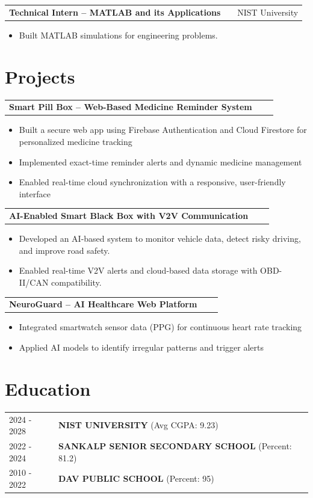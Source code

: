 \documentclass[a4paper,12pt]{article}
\makeatletter
\newenvironment{joblong}[2]
    {
    \begin{tabularx}{\linewidth}{@{}l X r@{}}
    \textbf{#1} & \hfill &  #2 \\[3.75pt]
    \end{tabularx}
    \begin{minipage}[t]{\linewidth}
    \begin{itemize}[nosep,after=\strut, leftmargin=1em, itemsep=3pt,label=--]
    }
    {
    \end{itemize}
    \end{minipage}    
    }
\makeatother
\begin{document}
\begin{joblong}{Technical Intern – MATLAB and its Applications}{NIST University}
\item Built MATLAB simulations for engineering problems.
\end{joblong}
  
\section{Projects}

\begin{joblong}{Smart Pill Box – Web-Based Medicine Reminder System}{}
\item Built a secure web app using Firebase Authentication and Cloud Firestore for personalized medicine tracking
\item Implemented exact-time reminder alerts and dynamic medicine management
\item Enabled real-time cloud synchronization with a responsive, user-friendly interface
\end{joblong}

\begin{joblong}{AI-Enabled Smart Black Box with V2V Communication}{}
\item Developed an AI-based system to monitor vehicle data, detect risky driving, and improve road safety.
\item Enabled real-time V2V alerts and cloud-based data storage with OBD-II/CAN compatibility.
\end{joblong}

\begin{joblong}{NeuroGuard – AI Healthcare Web Platform}{}
\item Integrated smartwatch sensor data (PPG) for continuous heart rate tracking
\item Applied AI models to identify irregular patterns and trigger alerts
\end{joblong}

\section{Education}
\begin{tabularx}{\linewidth}{@{}l X@{}}	
2024 - 2028 & \textbf{NIST UNIVERSITY} \hfill \normalsize (Avg CGPA: 9.23) \\

2022 - 2024 & \textbf{SANKALP SENIOR SECONDARY SCHOOL} \hfill (Percent: 81.2) \\ 

2010 - 2022 & \textbf{DAV PUBLIC SCHOOL} \hfill  (Percent: 95) \\
\end{tabularx}
\end{document}
